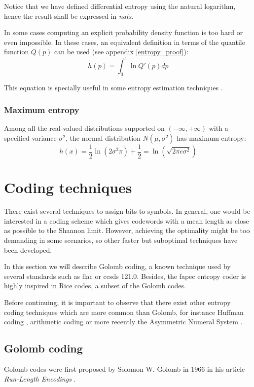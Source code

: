 Notice that we have defined differential entropy using the natural logarithm, hence the result shall be expressed in \textit{nats}.

In some cases computing an explicit probability density function is too hard or even impossible. In these cases, an equivalent definition in terms of the quantile function $Q(p)$ can be used (see appendix \ref{entropy_proof}):
\begin{equation} \label{eq:differential_entropy_q}
h(p) = \int_{0}^{1} \ln Q'(p) dp
\end{equation}

This equation is specially useful in some entropy estimation techniques \parencite{Vasicek}.

\subsubsection{Maximum entropy}
Among all the real-valued distributions supported on $(-\infty, +\infty)$ with a specified variance $\sigma^2$, the normal distribution $N(\mu, \sigma^2)$ has maximum entropy:
\begin{equation}
h(x) = \frac{1}{2} \ln \left(2\sigma^2\pi\right) + \frac{1}{2} = \ln\left(\sqrt{2\pi e \sigma^2}\right)
\end{equation}

\section{Coding techniques}
There exist several techniques to assign bits to symbols. In general, one would be interested in a coding scheme which gives codewords with a mean length as close as possible to the Shannon limit. However, achieving the optimality might be too demanding in some scenarios, so other faster but suboptimal techniques have been developed.

In this section we will describe Golomb coding, a known technique used by several standards such as \acrshort{flac} or \acrshort{ccsds} 121.0. Besides, the \acrshort{fapec} entropy coder is highly inspired in Rice codes, a subset of the Golomb codes.

Before continuing, it is important to observe that there exist other entropy coding techniques which are more common than Golomb, for instance Huffman coding \parencite{cover}, arithmetic coding \parencite{MacKay} or more recently the Asymmetric Numeral System \parencite{ans}.

\subsection{Golomb coding} \label{golomb-coding}

Golomb codes were first proposed by Solomon W. Golomb in 1966 in his article \textit{Run-Length Encodings} \parencite{Golomb1966}.

